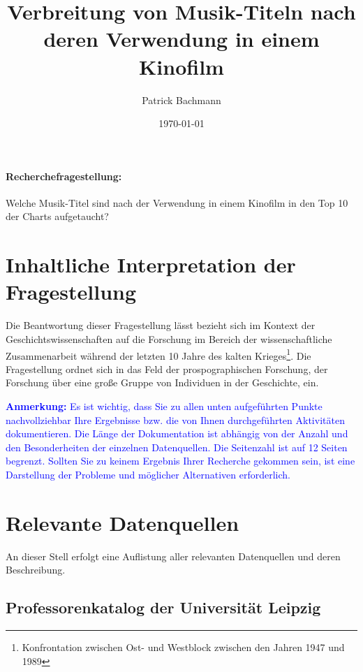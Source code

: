 \documentclass[parskip]{scrartcl}
\begin{document}
\subject{Projektdokumentation im Modul Semantic Web}
\title{Verbreitung von Musik-Titeln nach deren Verwendung in einem Kinofilm}
\author{Patrick Bachmann}
\date{\today}

\maketitle


\paragraph{Recherchefragestellung: }
Welche Musik-Titel sind nach der Verwendung in einem Kinofilm in den Top 10 der Charts aufgetaucht?


\section{Inhaltliche Interpretation der Fragestellung}

Die Beantwortung dieser Fragestellung lässt bezieht sich im Kontext der Geschichtswissenschaften auf die Forschung im Bereich der wissenschaftliche Zusammenarbeit während der letzten 10 Jahre des kalten Krieges\footnote{Konfrontation zwischen Ost- und Westblock zwischen den Jahren 1947 und 1989}. Die Fragestellung ordnet sich in das Feld der prospographischen Forschung, der Forschung über eine große Gruppe von Individuen in der Geschichte, ein.

\textcolor{blue}{\textbf{Anmerkung:} Es ist wichtig, dass Sie zu allen unten aufgeführten Punkte nachvoll\-ziehbar Ihre Ergebnisse bzw. die von Ihnen durchgeführten Aktivitäten dokumentieren. Die Länge der Dokumentation ist abhängig von der Anzahl und den Besonderheiten der einzelnen Datenquellen. Die Seitenzahl ist auf 12 Seiten begrenzt. Sollten Sie zu keinem Ergebnis Ihrer Recherche gekommen sein, ist eine Darstellung der Probleme und möglicher Alternativen erforderlich.}

\section{Relevante Datenquellen}

An dieser Stell erfolgt eine Auflistung aller relevanten Datenquellen und deren Beschreibung.

\subsection{Professorenkatalog der Universität Leipzig}
\end{document}
